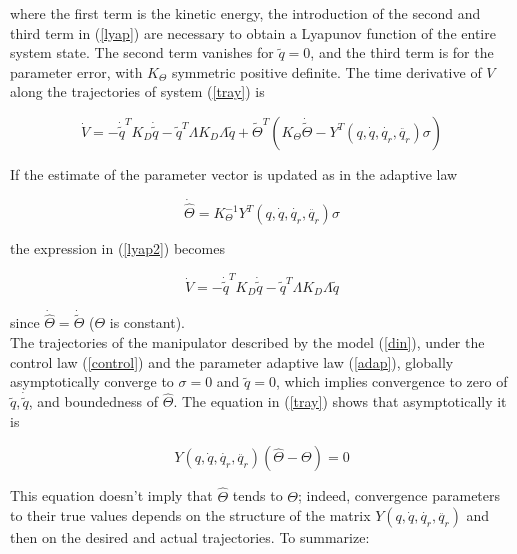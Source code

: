 where the first term is the kinetic energy, the introduction of the second and third term in (\ref{lyap}) are necessary to obtain a Lyapunov function of the entire system state. The second term vanishes for $\tilde{q}=0$, and the third term is for the parameter error, with $K_\Theta$ symmetric positive definite. The time derivative of $V$ along the trajectories of system (\ref{tray}) is

\begin{equation}
\dot{V}=-\dot{\tilde{q}}^T K_D \dot{\tilde{q}}-\tilde{q}^T \Lambda K_D \Lambda\tilde{q}+\tilde{\Theta}^T\left(K_{\Theta}\dot{\tilde{\Theta}}-Y^T(q,\dot{q},\dot{q_r},\ddot{q_r})\sigma\right)\label{lyap2}
\end{equation}

If the estimate of the parameter vector is updated as in the adaptive law

\begin{equation}
\dot{\hat{\Theta}}=K_{\Theta}^{-1}Y^T(q,\dot{q},\dot{q_r},\ddot{q_r})\sigma\label{adap}
\end{equation}

the expression in (\ref{lyap2}) becomes

\begin{equation}
\dot{V}=-\dot{\tilde{q}}^T K_D \dot{\tilde{q}}-\tilde{q}^T \Lambda K_D \Lambda \tilde{q}
\end{equation}

since $\dot{\hat{\Theta}}=\dot{\tilde{\Theta}}$ ($\Theta$ is constant).\\

The trajectories of the manipulator described by the model (\ref{din}), under the control law (\ref{control}) and the parameter adaptive law (\ref{adap}), globally asymptotically converge to $\sigma=0$ and $\tilde{q}=0$, which implies convergence to zero of $\tilde{q},\dot{\tilde{q}}$, and boundedness of $\hat{\Theta}$. The equation in (\ref{tray}) shows that asymptotically it is

\begin{equation}
Y(q,\dot{q},\dot{q_r},\ddot{q_r})\left(\hat{\Theta}-\Theta\right)=0
\end{equation}

This equation doesn't imply that $\hat{\Theta}$ tends to $\Theta$; indeed, convergence parameters to their true values depends on the structure of the matrix $Y(q,\dot{q},\dot{q_r},\ddot{q_r})$ and then on the desired and actual trajectories. To summarize:

